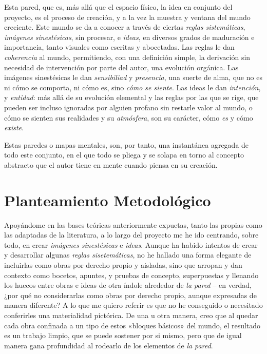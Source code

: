 Esta pared, que es, más allá que el espacio físico, la idea en conjunto
del proyecto, es el proceso de creación, y a la vez la muestra y ventana
del mundo creciente. Este mundo se da a conocer a través de ciertas
\emph{reglas sistemáticas}, \emph{imágenes sinestésicas}, sin procesar,
e \emph{ideas}, en diversos grados de maduración e importancia, tanto
visuales como escritas y abocetadas. Las reglas le dan \emph{coherencia}
al mundo, permitiendo, con una definición simple, la derivación sin
necesidad de intervención por parte del autor, una evolución orgánica.
Las imágenes sinestésicas le dan \emph{sensibiliad} y \emph{presencia},
una suerte de alma, que no es ni cómo se comporta, ni cómo es, sino
\emph{cómo se siente}. Las ideas le dan \emph{intención}, y
\emph{entidad}: más allá de su evolución elemental y las reglas por las
que se rige, que pueden ser incluso ignoradas por alguien profano sin
restarle valor al mundo, o cómo se sienten sus realidades y su
\emph{atmósfera}, son su carácter, cómo \emph{es} y cómo \emph{existe}.

Estas paredes o mapas mentales, son, por tanto, una instantánea agregada
de todo este conjunto, en el que todo se pliega y se solapa en torno al
concepto abstracto que el autor tiene en mente cuando piensa en su
creación.

\hypertarget{planteamiento-metodoluxf3gico}{%
\section{Planteamiento
Metodológico}\label{planteamiento-metodoluxf3gico}}

Apoyándome en las bases teóricas anteriormente expuetas, tanto las
propias como las adaptadas de la literatura, a lo largo del proyecto me
he ido centrando, sobre todo, en crear \emph{imágenes sinestésicas} e
\emph{ideas}. Aunque ha habido intentos de crear y desarrollar algunas
\emph{reglas sisetemáticas}, no he hallado una forma elegante de
incluirlas como obras por derecho propio y aisladas, sino que arropan y
dan contexto como bocetos, apuntes, y pruebas de concepto, superpuestas
y llenando los huecos entre obras e ideas de otra índole alrededor de
\emph{la pared} -- en verdad, ¿por qué no considerarlas como obras por
derecho propio, aunque expresadas de manera diferente? A lo que me
quiero referir es que no he conseguido o necesitado conferirles una
materialidad pictórica. De una u otra manera, creo que al quedar cada
obra confinada a un tipo de estos «bloques básicos» del mundo, el
resultado es un trabajo limpio, que se puede sostener por si mismo, pero
que de igual manera gana profundidad al rodearlo de los elementos de
\emph{la pared}.

